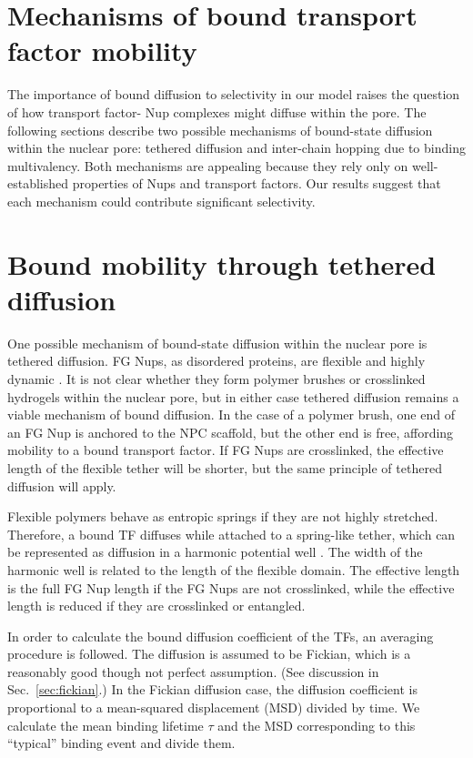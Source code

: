 \section{Mechanisms of  bound transport factor mobility}

The importance of bound diffusion to selectivity in our model raises the question of how transport factor- Nup complexes might diffuse within the pore.  The following sections describe two possible mechanisms of bound-state diffusion within the nuclear pore: tethered diffusion and inter-chain hopping due to binding multivalency.  Both mechanisms are appealing because they rely only on well-established properties of Nups and transport factors.  Our results suggest that each mechanism could contribute significant selectivity.

\section{Bound mobility through tethered diffusion}
One possible mechanism of bound-state diffusion within the nuclear pore is tethered diffusion.  FG Nups, as disordered proteins, are flexible and highly dynamic \cite{lim07, milles14, hough15,patel07}. It is not clear whether they form polymer brushes or crosslinked hydrogels within the nuclear pore, but in either case tethered diffusion remains a viable mechanism of bound diffusion.  In the case of a polymer brush, one end of an FG Nup is anchored to the NPC scaffold, but the other end is free, affording mobility to a bound transport factor.  If FG Nups are crosslinked, the effective length of the flexible tether will be shorter, but the same principle of tethered diffusion will apply.

Flexible polymers behave as entropic springs \cite{howard01} if they are not highly stretched. Therefore, a bound TF diffuses while attached to a spring-like tether, which can be represented as diffusion in a harmonic potential well .  The width of the harmonic well is related to the length of the flexible domain.  The effective length is the full FG Nup length if the FG Nups are not crosslinked, while the effective length is reduced if they are crosslinked or entangled\cite{ribbeck01}.  

In order to calculate the bound diffusion coefficient of the TFs, an averaging procedure is followed.  The diffusion is assumed to be Fickian, which is a reasonably good though not perfect assumption. (See discussion in Sec.~\ref{sec:fickian}.)  In the Fickian diffusion case, the diffusion coefficient is proportional to a mean-squared displacement (MSD) divided by time.  We calculate the mean binding lifetime $\tau$ and the MSD corresponding to this ``typical'' binding event and divide them.

